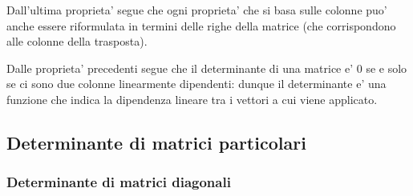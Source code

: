Dall'ultima proprieta' segue che ogni proprieta' che si basa sulle colonne puo' anche essere riformulata in termini delle righe della matrice (che corrispondono alle colonne della trasposta).

Dalle proprieta' precedenti segue che il determinante di una matrice e' $0$ se e solo se ci sono due colonne linearmente dipendenti: dunque il determinante e' una funzione che indica la dipendenza lineare tra i vettori a cui viene applicato.

\subsection{Determinante di matrici particolari}

\subsubsection{Determinante di matrici diagonali}

